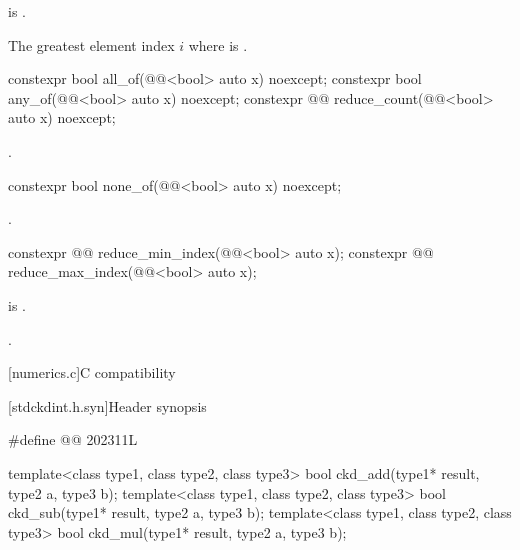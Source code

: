 \begin{itemdescr}
\pnum
\expects
{} is .

\pnum
\returns
The greatest element index $i$ where  is .
\end{itemdescr}

\begin{itemdecl}
constexpr bool all_of(@@<bool> auto x) noexcept;
constexpr bool any_of(@@<bool> auto x) noexcept;
constexpr @@ reduce_count(@@<bool> auto x) noexcept;
\end{itemdecl}

\begin{itemdescr}
\pnum
\returns
{}.
\end{itemdescr}

\begin{itemdecl}
constexpr bool none_of(@@<bool> auto x) noexcept;
\end{itemdecl}

\begin{itemdescr}
\pnum
\returns
{}.
\end{itemdescr}

\begin{itemdecl}
constexpr @@ reduce_min_index(@@<bool> auto x);
constexpr @@ reduce_max_index(@@<bool> auto x);
\end{itemdecl}

\begin{itemdescr}
\pnum
\expects
{} is .

\pnum
\returns
{}.
\end{itemdescr}

[numerics.c]{C compatibility}

[stdckdint.h.syn]{Header  synopsis}

%
\begin{codeblock}
#define @@ 202311L

template<class type1, class type2, class type3>
  bool ckd_add(type1* result, type2 a, type3 b);
template<class type1, class type2, class type3>
  bool ckd_sub(type1* result, type2 a, type3 b);
template<class type1, class type2, class type3>
  bool ckd_mul(type1* result, type2 a, type3 b);
\end{codeblock}

